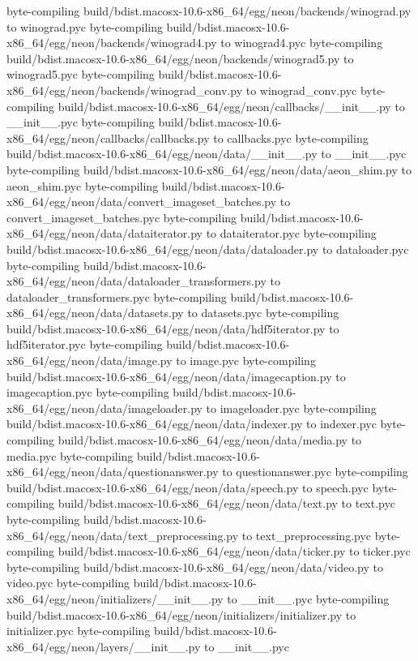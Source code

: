 byte-compiling build/bdist.macosx-10.6-x86_64/egg/neon/backends/winograd.py to winograd.pyc
byte-compiling build/bdist.macosx-10.6-x86_64/egg/neon/backends/winograd4.py to winograd4.pyc
byte-compiling build/bdist.macosx-10.6-x86_64/egg/neon/backends/winograd5.py to winograd5.pyc
byte-compiling build/bdist.macosx-10.6-x86_64/egg/neon/backends/winograd_conv.py to winograd_conv.pyc
byte-compiling build/bdist.macosx-10.6-x86_64/egg/neon/callbacks/__init__.py to __init__.pyc
byte-compiling build/bdist.macosx-10.6-x86_64/egg/neon/callbacks/callbacks.py to callbacks.pyc
byte-compiling build/bdist.macosx-10.6-x86_64/egg/neon/data/__init__.py to __init__.pyc
byte-compiling build/bdist.macosx-10.6-x86_64/egg/neon/data/aeon_shim.py to aeon_shim.pyc
byte-compiling build/bdist.macosx-10.6-x86_64/egg/neon/data/convert_imageset_batches.py to convert_imageset_batches.pyc
byte-compiling build/bdist.macosx-10.6-x86_64/egg/neon/data/dataiterator.py to dataiterator.pyc
byte-compiling build/bdist.macosx-10.6-x86_64/egg/neon/data/dataloader.py to dataloader.pyc
byte-compiling build/bdist.macosx-10.6-x86_64/egg/neon/data/dataloader_transformers.py to dataloader_transformers.pyc
byte-compiling build/bdist.macosx-10.6-x86_64/egg/neon/data/datasets.py to datasets.pyc
byte-compiling build/bdist.macosx-10.6-x86_64/egg/neon/data/hdf5iterator.py to hdf5iterator.pyc
byte-compiling build/bdist.macosx-10.6-x86_64/egg/neon/data/image.py to image.pyc
byte-compiling build/bdist.macosx-10.6-x86_64/egg/neon/data/imagecaption.py to imagecaption.pyc
byte-compiling build/bdist.macosx-10.6-x86_64/egg/neon/data/imageloader.py to imageloader.pyc
byte-compiling build/bdist.macosx-10.6-x86_64/egg/neon/data/indexer.py to indexer.pyc
byte-compiling build/bdist.macosx-10.6-x86_64/egg/neon/data/media.py to media.pyc
byte-compiling build/bdist.macosx-10.6-x86_64/egg/neon/data/questionanswer.py to questionanswer.pyc
byte-compiling build/bdist.macosx-10.6-x86_64/egg/neon/data/speech.py to speech.pyc
byte-compiling build/bdist.macosx-10.6-x86_64/egg/neon/data/text.py to text.pyc
byte-compiling build/bdist.macosx-10.6-x86_64/egg/neon/data/text_preprocessing.py to text_preprocessing.pyc
byte-compiling build/bdist.macosx-10.6-x86_64/egg/neon/data/ticker.py to ticker.pyc
byte-compiling build/bdist.macosx-10.6-x86_64/egg/neon/data/video.py to video.pyc
byte-compiling build/bdist.macosx-10.6-x86_64/egg/neon/initializers/__init__.py to __init__.pyc
byte-compiling build/bdist.macosx-10.6-x86_64/egg/neon/initializers/initializer.py to initializer.pyc
byte-compiling build/bdist.macosx-10.6-x86_64/egg/neon/layers/__init__.py to __init__.pyc
